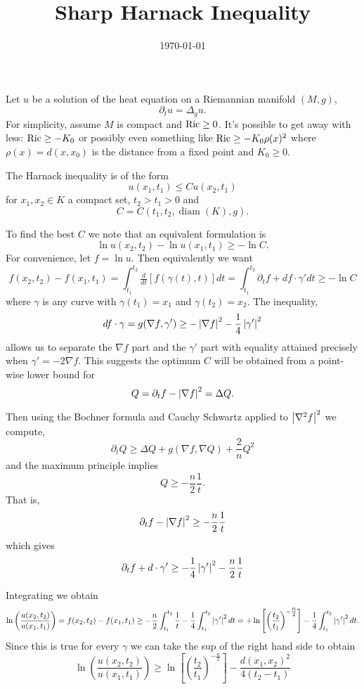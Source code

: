 \documentclass{amsart}
\begin{document}
\title{Sharp Harnack Inequality}

\curraddr{}
\email{}
\date{\today}

\dedicatory{}
\subjclass[2010]{}
\keywords{}

\maketitle

Let $u$ be a solution of the heat equation on a Riemannian manifold $(M, g)$,
\[
\partial_t u = \Delta_g u.
\]
For simplicity, assume $M$ is compact and $\operatorname{Ric} \geq 0$. It's possible to get away with less: $\operatorname{Ric} \geq - K_0$ or possibly even something like $\operatorname{Ric} \geq -K_0 \rho(x)^2$ where $\rho(x) = d(x, x_0)$ is the distance from a fixed point and $K_0 \geq 0$.

The Harnack inequality is of the form
\[
u(x_1, t_1) \leq C u(x_2, t_1)
\]
for $x_1, x_2 \in K$ a compact set, $t_2 > t_1 > 0$ and
\[
C = C(t_1, t_2, \operatorname{diam} (K), g).
\]

To find the best $C$ we note that an equivalent formulation is
\[
\ln u(x_2, t_2) - \ln u(x_1, t_1) \geq - \ln C.
\]
For convenience, let $f = \ln u$. Then equivalently we want
\[
f(x_2, t_2) - f(x_1, t_1) = \int_{t_1}^{t_2} \tfrac{d}{dt} [f(\gamma(t), t)] dt = \int_{t_1}^{t_2} \partial_t f + df \cdot \gamma' dt \geq - \ln C
\]
where $\gamma$ is any curve with $\gamma(t_1) = x_1$ and $\gamma(t_2) = x_2$. The inequality,
\[
df \cdot \gamma = g(\nabla f, \gamma') \geq -\left|{\nabla f}\right|^2 - \frac{1}{4} \left|{\gamma'}\right|^2
\]
allows us to separate the $\nabla f$ part and the $\gamma'$ part with equality attained precisely when $\gamma' = -2\nabla f$. This suggests the optimum $C$ will be obtained from a point-wise lower bound for
\[
Q = \partial_t f - \left|{\nabla f}\right|^2 = \Delta Q.
\]

Then using the Bochner formula and Cauchy Schwartz applied to $\left|{\nabla^2 f}\right|^2$ we compute,
\[
\partial_t Q \geq \Delta Q + g(\nabla f, \nabla Q) + \frac{2}{n} Q^2
\]
and the maximum principle implies
\[
Q \geq -\frac{n}{2} \frac{1}{t}.
\]
That is,
\[
\partial_t f - \left|{\nabla f}\right|^2 \geq -\frac{n}{2} \frac{1}{t}
\]
which gives
\[
\partial_t f + d \cdot \gamma' \geq - \frac{1}{4} \left|{\gamma'}\right|^2 - \frac{n}{2} \frac{1}{t}
\]

Integrating we obtain
\[
\ln \left(\frac{u(x_2, t_2)}{u(x_1, t_1)}\right) = f(x_2, t_2) - f(x_1, t_1) \geq - \frac{n}{2} \int_{t_1}^{t_2} \frac{1}{t} - \frac{1}{4} \int_{t_1}^{t_2} \left|{\gamma'}\right|^2 dt = + \ln\left[\left(\frac{t_2}{t_1}\right)^{-\tfrac{n}{2}}\right] - \frac{1}{4} \int_{t_1}^{t_2} \left|{\gamma'}\right|^2 dt.
\]
Since this is true for every $\gamma$ we can take the sup of the right hand side to obtain
\[
\ln \left(\frac{u(x_2, t_2)}{u(x_1, t_1)}\right) \geq  \ln\left[\left(\frac{t_2}{t_1}\right)^{-\tfrac{n}{2}}\right] - \frac{d(x_1, x_2)^2}{4(t_2 - t_1)}
\]
\end{document}
